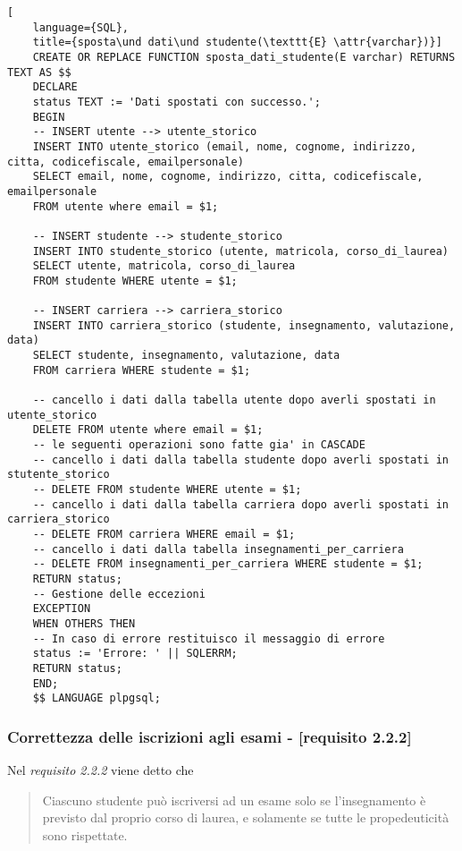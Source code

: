 \documentclass{article}
\newcommand{\attr}[1]{\texttt{\textcolor{gray}{#1}}}
\newcommand{\und}[0]{\textunderscore}
\begin{document}
    \begin{lstlisting}[
    language={SQL},
    title={sposta\und dati\und studente(\texttt{E} \attr{varchar})}]
    CREATE OR REPLACE FUNCTION sposta_dati_studente(E varchar) RETURNS TEXT AS $$
    DECLARE
    status TEXT := 'Dati spostati con successo.';
    BEGIN
    -- INSERT utente --> utente_storico
    INSERT INTO utente_storico (email, nome, cognome, indirizzo, citta, codicefiscale, emailpersonale)
    SELECT email, nome, cognome, indirizzo, citta, codicefiscale, emailpersonale
    FROM utente where email = $1;

    -- INSERT studente --> studente_storico
    INSERT INTO studente_storico (utente, matricola, corso_di_laurea)
    SELECT utente, matricola, corso_di_laurea
    FROM studente WHERE utente = $1;

    -- INSERT carriera --> carriera_storico
    INSERT INTO carriera_storico (studente, insegnamento, valutazione, data)
    SELECT studente, insegnamento, valutazione, data
    FROM carriera WHERE studente = $1;

    -- cancello i dati dalla tabella utente dopo averli spostati in utente_storico
    DELETE FROM utente where email = $1;
    -- le seguenti operazioni sono fatte gia' in CASCADE
    -- cancello i dati dalla tabella studente dopo averli spostati in stutente_storico
    -- DELETE FROM studente WHERE utente = $1;
    -- cancello i dati dalla tabella carriera dopo averli spostati in carriera_storico
    -- DELETE FROM carriera WHERE email = $1;
    -- cancello i dati dalla tabella insegnamenti_per_carriera
    -- DELETE FROM insegnamenti_per_carriera WHERE studente = $1;
    RETURN status;
    -- Gestione delle eccezioni
    EXCEPTION
    WHEN OTHERS THEN
    -- In caso di errore restituisco il messaggio di errore
    status := 'Errore: ' || SQLERRM;
    RETURN status;
    END;
    $$ LANGUAGE plpgsql;
\end{lstlisting}
\subsubsection{Correttezza delle iscrizioni agli esami - [requisito 2.2.2]}
Nel \textit{requisito 2.2.2} viene detto che
\begin{quote}
    Ciascuno studente può iscriversi ad un esame solo se l'insegnamento è previsto dal proprio corso di laurea, e solamente se tutte le propedeuticità sono rispettate.
\end{quote}
\end{document}
